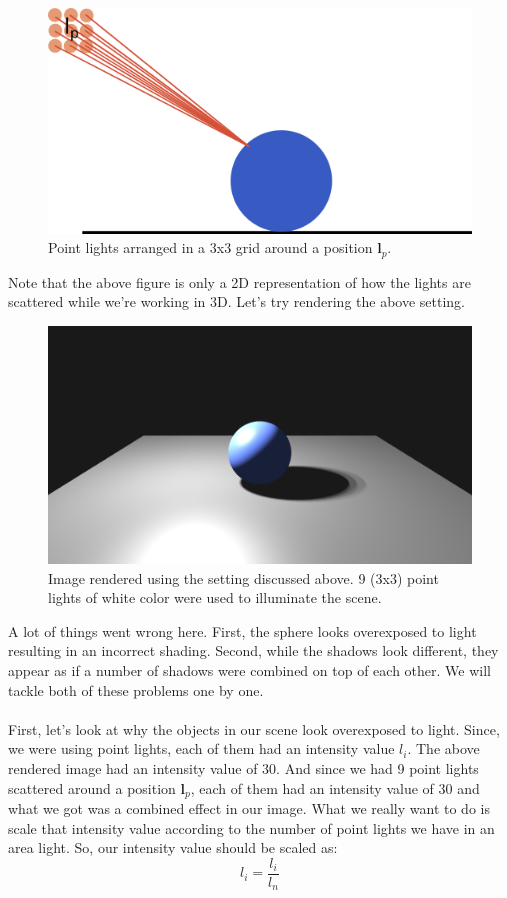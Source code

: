 \documentclass[11pt,a4paper]{article}
\begin{document}
	\begin{figure}[H]
		\centering
		\captionsetup{justification=centering}
		\includegraphics[width=.4\textwidth]{arealight1}\quad
		\caption{Point lights arranged in a 3x3 grid around a position $\boldsymbol{l}_{p}$.}
	\end{figure}
	 \noindent
	 Note that the above figure is only a 2D representation of how the lights are scattered while we're working in 3D. Let's try rendering the above setting.
	 \begin{figure}[H]
	 	\centering
	 	\captionsetup{justification=centering}
	 	\includegraphics[width=.4\textwidth]{arealight2}\quad
	 	\caption{Image rendered using the setting discussed above. 9 (3x3) point lights of white color were used to illuminate the scene.}
	 \end{figure}
 	\noindent
 	A lot of things went wrong here. First, the sphere looks overexposed to light resulting in an incorrect shading. Second, while the shadows look different, they appear as if a number of shadows were combined on top of each other. We will tackle both of these problems one by one.
 	\\~\\
 	\noindent
 	First, let's look at why the objects in our scene look overexposed to light. Since, we were using point lights, each of them had an intensity value $l_{i}$. The above rendered image had an intensity value of $30$. And since we had 9 point lights scattered around a position $\boldsymbol{l}_{p}$, each of them had an intensity value of $30$ and what we got was a combined effect in our image. What we really want to do is scale that intensity value according to the number of point lights we have in an area light. So, our intensity value should be scaled as:
 	\begin{equation}
 		l_{i} = \frac{l_{i}}{l_{n}}
 	\end{equation}
\end{document}
